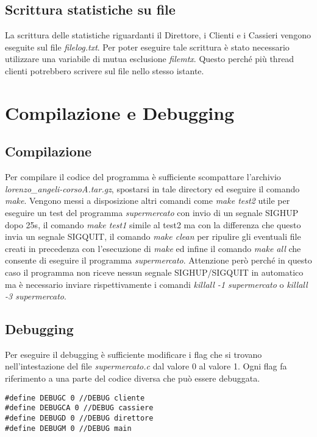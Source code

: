 \documentclass{article} %
\begin{document}
 \subsection{Scrittura statistiche su file}
 La scrittura delle statistiche riguardanti il Direttore, i Clienti e i Cassieri vengono eseguite sul file {\itshape filelog.txt}. Per poter eseguire tale scrittura è stato necessario utilizzare una variabile di mutua esclusione {\itshape filemtx}. Questo perché più thread clienti potrebbero scrivere sul file nello stesso istante. 
\section{Compilazione e Debugging}
\subsection{Compilazione}
Per compilare il codice del programma è sufficiente scompattare l'archivio {\itshape lorenzo\_angeli-corsoA.tar.gz}, spostarsi in tale directory ed eseguire il comando {\itshape make}. Vengono messi a disposizione altri comandi come {\itshape make test2} utile per eseguire un test del programma {\itshape supermercato} con invio di un segnale SIGHUP dopo 25s, il comando {\itshape make test1} simile al test2 ma con la differenza che questo invia un segnale SIGQUIT, il comando {\itshape make clean} per ripulire gli eventuali file creati in precedenza con l'esecuzione di {\itshape make} ed infine il comando {\itshape make all} che consente di eseguire il programma {\itshape supermercato}. Attenzione però perché in questo caso il programma non riceve nessun segnale SIGHUP/SIGQUIT in automatico ma è necessario inviare rispettivamente i comandi {\itshape killall -1 supermercato} o {\itshape killall -3 supermercato}.
\subsection{Debugging}
Per eseguire il debugging è sufficiente modificare i flag che si trovano nell'intestazione del file {\itshape supermercato.c} dal valore 0 al valore 1. Ogni flag fa riferimento a una parte del codice diversa che può essere debuggata.
\begin{lstlisting}
#define DEBUGC 0 //DEBUG cliente
#define DEBUGCA 0 //DEBUG cassiere
#define DEBUGD 0 //DEBUG direttore
#define DEBUGM 0 //DEBUG main
\end{lstlisting}
\end{document}
